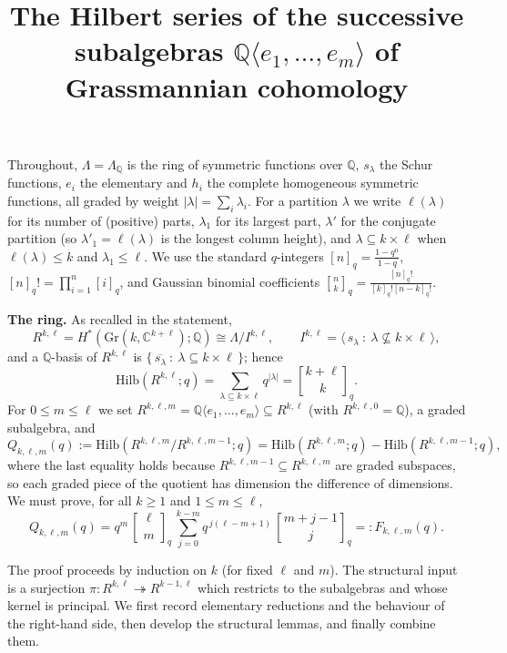 \documentclass{amsart}
\theoremstyle{definition}
\newcommand{\Gr}{\mathrm{Gr}}
\newcommand{\Hilb}{\mathrm{Hilb}}
\newcommand{\qbin}[2]{\genfrac{[}{]}{0pt}{}{#1}{#2}_q}
\newcommand{\Q}{\mathbb{Q}}
\newcommand{\rkl}{R^{k,\ell}}
\newcommand{\Rklm}{R^{k,\ell,m}}
\begin{document}
\title{The Hilbert series of the successive subalgebras
$\Q\langle e_1,\dots ,e_m\rangle$ of Grassmannian cohomology}
\maketitle

Throughout, $\Lambda=\Lambda_{\Q}$ is the ring of symmetric functions over $\Q$,
$s_\lambda$ the Schur functions, $e_i$ the elementary and $h_i$ the complete
homogeneous symmetric functions, all graded by weight $|\lambda|=\sum_i\lambda_i$.
For a partition $\lambda$ we write $\ell(\lambda)$ for its number of (positive)
parts, $\lambda_1$ for its largest part, $\lambda'$ for the conjugate partition
(so $\lambda'_1=\ell(\lambda)$ is the longest column height), and
$\lambda\subseteq k\times\ell$ when
$\ell(\lambda)\le k$ and $\lambda_1\le\ell$. We use the standard $q$-integers
$[n]_q=\frac{1-q^n}{1-q}$, $[n]_q!=\prod_{i=1}^n[i]_q$, and Gaussian binomial
coefficients $\qbin{n}{k}=\frac{[n]_q!}{[k]_q![n-k]_q!}$.

\medskip
\noindent\textbf{The ring.} As recalled in the statement,
\[
\rkl=H^{*}(\Gr(k,\mathbb{C}^{k+\ell});\Q)\cong
\Lambda\big/ I^{k,\ell},
\qquad
I^{k,\ell}=\big\langle\, s_\lambda \ :\ \lambda\not\subseteq k\times\ell\,\big\rangle ,
\]
and a $\Q$-basis of $\rkl$ is $\{\,\overline{s_\lambda}\ :\ \lambda\subseteq k\times\ell\,\}$;
hence
\begin{equation}\label{eq:HilbR}
\Hilb(\rkl;q)=\sum_{\lambda\subseteq k\times\ell}q^{|\lambda|}=\qbin{k+\ell}{k}.
\end{equation}
For $0\le m\le\ell$ we set $\Rklm=\Q\langle e_1,\dots,e_m\rangle\subseteq\rkl$
(with $R^{k,\ell,0}=\Q$), a graded subalgebra, and
\[
Q_{k,\ell,m}(q):=\Hilb\!\left(\Rklm/R^{k,\ell,m-1};q\right)
=\Hilb(\Rklm;q)-\Hilb(R^{k,\ell,m-1};q),
\]
where the last equality holds because $R^{k,\ell,m-1}\subseteq\Rklm$ are graded
subspaces, so each graded piece of the quotient has dimension the difference of
dimensions. We must prove, for all $k\ge1$ and $1\le m\le\ell$,
\begin{equation}\label{eq:main}
Q_{k,\ell,m}(q)=q^{m}\,\qbin{\ell}{m}\,
\sum_{j=0}^{k-m} q^{\,j(\ell-m+1)}\,\qbin{m+j-1}{j}
=:F_{k,\ell,m}(q).
\end{equation}

\bigskip
The proof proceeds by induction on $k$ (for fixed $\ell$ and $m$). The structural
input is a surjection $\pi\colon\rkl\twoheadrightarrow R^{k-1,\ell}$ which restricts
to the subalgebras and whose kernel is principal. We first record elementary
reductions and the behaviour of the right-hand side, then develop the structural
lemmas, and finally combine them.
\end{document}
